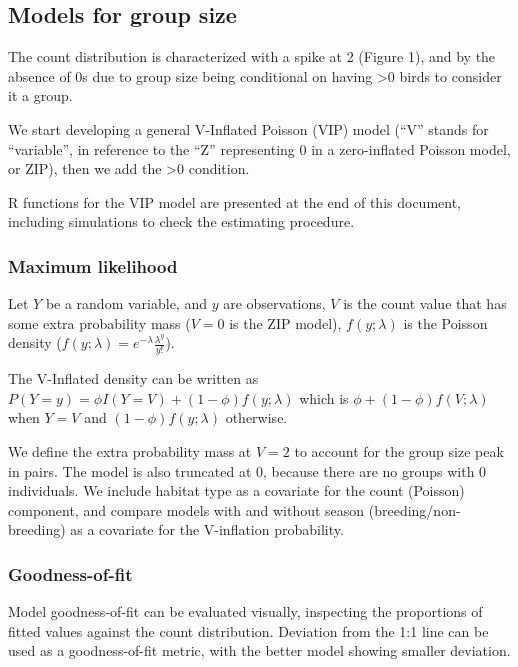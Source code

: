 \documentclass[]{article}
\begin{document}
\subsection{Models for group size}\label{models-for-group-size}

The count distribution is characterized with a spike at 2 (Figure 1),
and by the absence of 0s due to group size being conditional on having
\textgreater{}0 birds to consider it a group.

We start developing a general V-Inflated Poisson (VIP) model (``V''
stands for ``variable'', in reference to the ``Z'' representing 0 in a
zero-inflated Poisson model, or ZIP), then we add the \textgreater{}0
condition.

R functions for the VIP model are presented at the end of this document,
including simulations to check the estimating procedure.

\subsubsection{Maximum likelihood}\label{maximum-likelihood}

Let \(Y\) be a random variable, and \(y\) are observations, \(V\) is the
count value that has some extra probability mass (\(V=0\) is the ZIP
model), \(f(y; \lambda)\) is the Poisson density
(\(f(y; \lambda) = e^{-\lambda} \frac{\lambda^{y}}{y!}\)).

The V-Inflated density can be written as
\(P(Y=y) = \phi I(Y=V) + (1-\phi) f(y; \lambda)\) which is
\(\phi + (1-\phi) f(V; \lambda)\) when \(Y=V\) and
\((1-\phi) f(y; \lambda)\) otherwise.

We define the extra probability mass at \(V=2\) to account for the group
size peak in pairs. The model is also truncated at 0, because there are
no groups with 0 individuals. We include habitat type as a covariate for
the count (Poisson) component, and compare models with and without
season (breeding/non-breeding) as a covariate for the V-inflation
probability.

\subsubsection{Goodness-of-fit}\label{goodness-of-fit}

Model goodness-of-fit can be evaluated visually, inspecting the
proportions of fitted values against the count distribution. Deviation
from the 1:1 line can be used as a goodness-of-fit metric, with the
better model showing smaller deviation.
\end{document}
